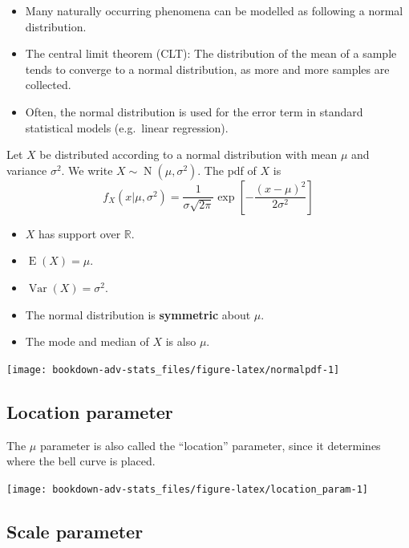 \documentclass[
]{book}
\providecommand{\tightlist}{%
  \setlength{\itemsep}{0pt}\setlength{\parskip}{0pt}}
\DeclareMathOperator{\E}{E}
\DeclareMathOperator{\Var}{Var}
\DeclareMathOperator{\N}{N}
\newcommand{\bbR}{\mathbb{R}}
\theoremstyle{definition}
\theoremstyle{definition}
\theoremstyle{definition}
\theoremstyle{definition}
\theoremstyle{remark}
\begin{document}
\begin{itemize}
\tightlist
\item
  Many naturally occurring phenomena can be modelled as following a normal distribution.
\item
  The central limit theorem (CLT): The distribution of the mean of a sample tends to converge to a normal distribution, as more and more samples are collected.
\item
  Often, the normal distribution is used for the error term in standard statistical models (e.g.~linear regression).
\end{itemize}

Let \(X\) be distributed according to a normal distribution with mean \(\mu\) and variance \(\sigma^2\). We write \(X\sim\N(\mu,\sigma^2)\).
The pdf of \(X\) is
\[
f_X(x|\mu,\sigma^2)= \frac{1}{\sigma\sqrt{2\pi}}\exp\left[-\frac{(x-\mu)^2}{2\sigma^2} \right]
\]

\begin{itemize}
\tightlist
\item
  \(X\) has support over \(\bbR\).
\item
  \(\E(X)=\mu\).
\item
  \(\Var(X)=\sigma^2\).
\item
  The normal distribution is \textbf{symmetric} about \(\mu\).
\item
  The mode and median of \(X\) is also \(\mu\).
\end{itemize}

\begin{center}\texttt{[image: bookdown-adv-stats\_files/figure-latex/normalpdf-1]} \end{center}

\hypertarget{location-parameter}{%
\subsection{Location parameter}\label{location-parameter}}

The \(\mu\) parameter is also called the ``location'' parameter, since it determines where the bell curve is placed.

\begin{center}\texttt{[image: bookdown-adv-stats\_files/figure-latex/location\_param-1]} \end{center}

\hypertarget{scale-parameter}{%
\subsection{Scale parameter}\label{scale-parameter}}
\end{document}
